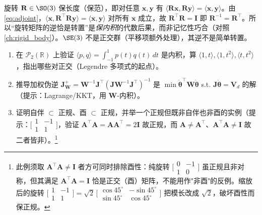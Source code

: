 \begin{example}[$\mathbf{R}^{-1}=\mathbf{R}^\top$ 不是巧合，是“正交=保内积”的必然]\label{ex:orthogonal}
旋转 $\mathbf{R}\in\SO(3)$ 保长度（保范），即对任意 $\mathbf{x},\mathbf{y}$ 有 $\langle\mathbf{R}\mathbf{x},\mathbf{R}\mathbf{y}\rangle=\langle\mathbf{x},\mathbf{y}\rangle$。由 \cref{eq:adjoint}，$\langle\mathbf{x},\mathbf{R}^\top\mathbf{R}\mathbf{y}\rangle=\langle\mathbf{x},\mathbf{y}\rangle$ 对所有 $\mathbf{x}$ 成立，故 $\mathbf{R}^\top\mathbf{R}=\mathbf{I}$ 即 $\mathbf{R}^{-1}=\mathbf{R}^\top$。所以“旋转矩阵的逆恰是转置”是\emph{保内积}的代数后果，而非记忆性巧合（对照 \cref{ch:rigid_body}）。$\SE(3)$ 不是正交群（平移项额外处理），其逆不是简单转置。
\end{example}

\begin{practice}
\begin{enumerate}
  \item 在 $\mathcal{P}_2(\mathbb{R})$ 上验证 $\langle p,q\rangle=\int_{-1}^1 p(t)q(t)\,dt$ 是内积，算 $\langle1,t\rangle,\langle1,t^2\rangle,\langle t,t^2\rangle$，指出哪些对正交（Legendre 多项式的起点）。
  \item 推导加权伪逆 $\mathbf{J}^+_{\mathbf{W}}=\mathbf{W}^{-1}\mathbf{J}^\top(\mathbf{J}\mathbf{W}^{-1}\mathbf{J}^\top)^{-1}$ 是 $\min\dot{\boldsymbol{\theta}}^\top\mathbf{W}\dot{\boldsymbol{\theta}}$ s.t. $\mathbf{J}\dot{\boldsymbol{\theta}}=\mathbf{V}_d$ 的解（提示：Lagrange/KKT，用 $\mathbf{W}$-内积）。
  \item 证明自伴 $\subset$ 正规、酉 $\subset$ 正规，并举一个正规但既非自伴也非酉的实例（提示：$\bigl[\begin{smallmatrix}1&-1\\1&1\end{smallmatrix}\bigr]$，验证 $\mathbf{A}^\top\mathbf{A}=\mathbf{A}\mathbf{A}^\top=2\mathbf{I}$ 故正规，而 $\mathbf{A}\neq\mathbf{A}^\top$、$\mathbf{A}^\top\mathbf{A}\neq\mathbf{I}$ 故二者皆非）。\footnote{此例须取 $\mathbf{A}^\top\mathbf{A}\neq\mathbf{I}$ 者方可同时排除酉性：纯旋转 $\bigl[\begin{smallmatrix}0&-1\\1&0\end{smallmatrix}\bigr]$ 虽正规且非对称，但其满足 $\mathbf{A}^\top\mathbf{A}=\mathbf{I}$ 恰是正交（酉）矩阵，不能用作"非酉"的反例。缩放后的旋转 $\bigl[\begin{smallmatrix}1&-1\\1&1\end{smallmatrix}\bigr]=\sqrt2\,\bigl[\begin{smallmatrix}\cos45^\circ&-\sin45^\circ\\\sin45^\circ&\cos45^\circ\end{smallmatrix}\bigr]$ 把模长改成 $\sqrt2$，破坏酉性而保正规。}
\end{enumerate}
\end{practice}

